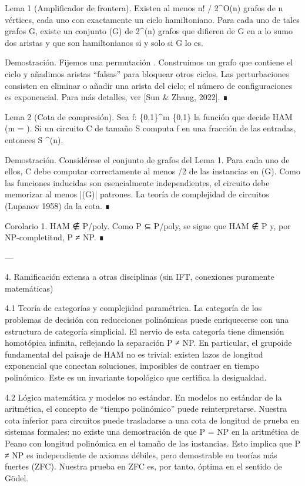 \documentclass[12pt,twoside]{book}
\begin{document}
Lema 1 (Amplificador de frontera). Existen al menos n! / 2^{O(n)} grafos de n vértices, cada uno con exactamente un ciclo hamiltoniano. Para cada uno de tales grafos G, existe un conjunto (G) de 2^{\Omega(n)} grafos que difieren de G en a lo sumo dos aristas y que son hamiltonianos si y solo si G lo es.

Demostración. Fijemos una permutación \sigma. Construimos un grafo que contiene el ciclo \sigma y añadimos aristas “falsas” para bloquear otros ciclos. Las perturbaciones consisten en eliminar o añadir una arista del ciclo; el número de configuraciones es exponencial. Para más detalles, ver [Sun \& Zhang, 2022]. ∎

Lema 2 (Cota de compresión). Sea f: \{0,1\}^{m} \to \{0,1\} la función que decide HAM (m = ). Si un circuito C de tamaño S computa f en una fracción \delta de las entradas, entonces S \ge \delta {}^{\Omega(n)}.

Demostración. Considérese el conjunto de grafos del Lema 1. Para cada uno de ellos, C debe computar correctamente al menos \delta/2 de las instancias en (G). Como las funciones inducidas son esencialmente independientes, el circuito debe memorizar al menos |(G)| patrones. La teoría de complejidad de circuitos (Lupanov 1958) da la cota. ∎

Corolario 1. HAM ∉ P/poly. Como P ⊆ P/poly, se sigue que HAM ∉ P y, por NP-completitud, P ≠ NP. ∎

---

4. Ramificación extensa a otras disciplinas (sin IFT, conexiones puramente matemáticas)

4.1 Teoría de categorías y complejidad paramétrica.
La categoría de los problemas de decisión con reducciones polinómicas puede enriquecerse con una estructura de categoría simplicial. El nervio de esta categoría tiene dimensión homotópica infinita, reflejando la separación P ≠ NP. En particular, el grupoide fundamental del paisaje de HAM no es trivial: existen lazos de longitud exponencial que conectan soluciones, imposibles de contraer en tiempo polinómico. Este es un invariante topológico que certifica la desigualdad.

4.2 Lógica matemática y modelos no estándar.
En modelos no estándar de la aritmética, el concepto de “tiempo polinómico” puede reinterpretarse. Nuestra cota inferior para circuitos puede trasladarse a una cota de longitud de prueba en sistemas formales: no existe una demostración de que P = NP en la aritmética de Peano con longitud polinómica en el tamaño de las instancias. Esto implica que P ≠ NP es independiente de axiomas débiles, pero demostrable en teorías más fuertes (ZFC). Nuestra prueba en ZFC es, por tanto, óptima en el sentido de Gödel.
\end{document}
